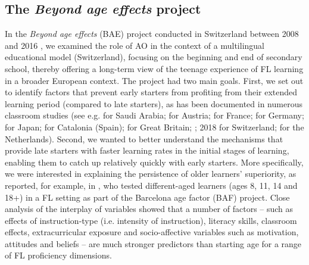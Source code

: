 \documentclass[output=paper,modfonts,nonflat,newtxmath]{langsci/langscibook}
\begin{document}
\subsection{The \textit{Beyond age effects} project}
\label{sec:pfenninger:2.1.}

In the \textit{Beyond age effects} (BAE) project conducted in Switzerland between 2008 and 2016 \citep{Pfenninger2017}, we examined the role of AO in the context of a multilingual educational model (Switzerland), focusing on the beginning and end of secondary school, thereby offering a long-term view of the teenage experience of FL learning in a broader European context. The project had two main goals. First, we set out to identify factors that prevent early starters from profiting from their extended learning period (compared to late starters), as has been documented in numerous classroom studies (see e.g. \citealt{Al-Thubaiti2010} for Saudi Arabia; \citealt{Buchholz2007} for Austria; \citealt{Genelot1997} for France; \citealt{JaekelEtAl2017} for Germany; \citealt{Larson-Hall2008} for Japan; \citealt{Muñoz2006} for Catalonia (Spain); \citealt{GrahamEtAl2017} for Great Britain; \citealt{Pfenninger2017}; 2018 for Switzerland; \citealt{UnsworthEtAl2015} for the Netherlands). Second, we wanted to better understand the mechanisms that provide late starters with faster learning rates in the initial stages of learning, enabling them to catch up relatively quickly with early starters. More specifically, we were interested in explaining the persistence of older learners’ superiority, as reported, for example, in \citet{Muñoz2006}, who tested different-aged learners (ages 8, 11, 14 and 18+) in a FL setting as part of the Barcelona age factor (BAF) project. Close analysis of the interplay of variables showed that a number of factors – such as effects of instruction-type (i.e. intensity of instruction), literacy skills, classroom effects, extracurricular exposure and socio-affective variables such as motivation, attitudes and beliefs – are much stronger predictors than starting age for a range of FL proficiency dimensions.
\end{document}
